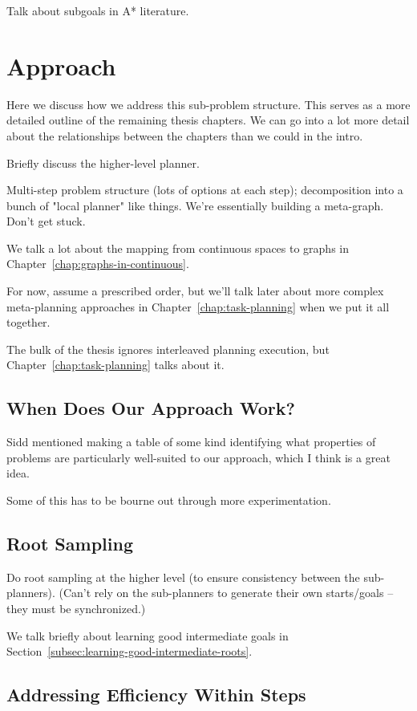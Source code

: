 Talk about subgoals in A* literature.

\section{Approach}
\label{sec:subprobs:approach}

Here we discuss how we address this sub-problem structure.
This serves as a more detailed outline of the remaining
thesis chapters.
We can go into a lot more detail about the relationships
between the chapters than we could in the intro.

Briefly discuss the higher-level planner.

Multi-step problem structure (lots of options at each step);
decomposition into a bunch of "local planner" like things.
We're essentially building a meta-graph.
Don't get stuck.

We talk a lot about the mapping
from continuous spaces to graphs in
Chapter~\ref{chap:graphs-in-continuous}.

For now, assume a prescribed order,
but we'll talk later about more complex meta-planning
approaches
in Chapter~\ref{chap:task-planning}
when we put it all together.

The bulk of the thesis ignores
interleaved planning execution,
but Chapter~\ref{chap:task-planning}
talks about it.

\subsection{When Does Our Approach Work?}

Sidd mentioned making a table of some kind
identifying what properties of problems are particularly
well-suited to our approach,
which I think is a great idea.

Some of this has to be bourne out through more experimentation.

\subsection{Root Sampling}

Do root sampling at the higher level
(to ensure consistency between the sub-planners).
(Can't rely on the sub-planners to generate their own starts/goals --
they must be synchronized.)

We talk briefly about learning good intermediate goals
in Section~\ref{subsec:learning-good-intermediate-roots}.

\subsection{Addressing Efficiency Within Steps}

